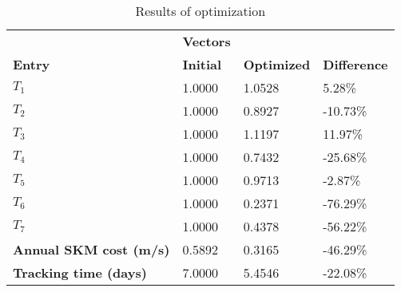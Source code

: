 \begin{table}[H]
\centering
\begin{tabular}{llll}
\textbf{}      & \cellcolor[HTML]{EFEFEF}\textbf{Vectors} & \textbf{} & \textbf{}         \\
\rowcolor[HTML]{EFEFEF} 
\textbf{Entry} & \textbf{Initial} & \textbf{Optimized} & \textbf{Difference} \\
$T_1$ & 1.0000 & 1.0528 & 5.28\% \\ 
$T_2$ & 1.0000 & 0.8927 & -10.73\% \\ 
$T_3$ & 1.0000 & 1.1197 & 11.97\% \\ 
$T_4$ & 1.0000 & 0.7432 & -25.68\% \\ 
$T_5$ & 1.0000 & 0.9713 & -2.87\% \\ 
$T_6$ & 1.0000 & 0.2371 & -76.29\% \\ 
$T_7$ & 1.0000 & 0.4378 & -56.22\% \\ 
\rowcolor[HTML]{EFEFEF} 
\textbf{Annual SKM cost (m/s)}  & 0.5892 & 0.3165 & -46.29\% \\ 
\rowcolor[HTML]{EFEFEF} 
\textbf{Tracking time (days)}  & 7.0000 & 5.4546 & -22.08\% \\ 
\end{tabular}
\caption{Results of optimization}
\label{tab:OptimizationAnalysis}
\end{table}